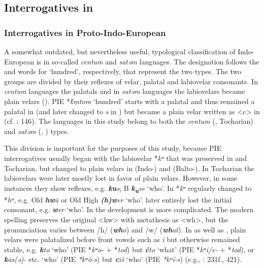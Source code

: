 \subsection{Interrogatives in }\label{sec:5.5.3}

\subsubsection{Interrogatives in Proto-{Indo-European}}\label{sec:5.5.3.1}

A somewhat outdated, but nevertheless useful, typological classification of {Indo-Euro\-pean} is in so-called \textit{centum} and \textit{satəm} languages. The designation follows the  and  words for ‘hundred’, respectively, that represent the two types. The two groups are divided by their reflexes of  velar, palatal and labiovelar consonants. In \textit{centum} languages the palatals and in \textit{satəm} languages the labiovelars became plain velars (). PIE *\textit{ḱ\d{m}}\textit{tom} ‘hundred’ starts with a palatal and thus remained a palatal in  (and later changed to \textit{s} in ) but became a plain velar written as <c> in  (cf. \citealt{Fortson2010}: 146). The languages in this study belong to both the \textit{centum} (, Tocharian) and \textit{satəm} (, ) types.

This division is important for the purposes of this study, because PIE interrogatives usually began with the labiovelar *\textit{kʷ} that was preserved in  and Tocharian, but changed to plain velars in (Indo-) and (Balto-). In Tocharian the labiovelars were later mostly lost in favor of plain velars. However, in some instances they show reflexes, e.g.  \textbf{\textit{ku}}\textit{s}, B \textbf{\textit{k}}\textbf{\textit{\textsubscript{u}}}\textit{se} ‘who’. In  *\textit{kʷ} regularly changed to *\textit{hʷ}, e.g. Old  \textbf{\textit{hw}}\textit{\=a} or Old High  \textbf{\textit{(h)w}}\textit{er} ‘who’.  later entirely lost the initial consonant, e.g.  \textbf{\textit{w}}\textit{er} ‘who’. In  the development is more complicated. The modern spelling preserves the original <hw> with metathesis as <wh>, but the pronunciation varies between /h/ (\textbf{\textit{wh}}\textit{o}) and /w/ (\textbf{\textit{wh}}\textit{at}). In  as well as , plain velars were palatalized before front vowels such as \textit{i} but otherwise remained stable, e.g.  \textbf{\textit{k}}\textit{to} ‘who’ (PIE *\textit{kʷ}\textit{o-} + *\textit{tod}) but \textbf{\textit{č}}\textit{to} ‘what’ (PIE *\textit{kʷ}\textit{i/e-} + *\textit{tod}), or  \textbf{\textit{k}}\textit{as(ə)-} etc. ‘who’ (PIE \textit{*kʷ}\textit{ó-s}) but \textbf{\textit{c}}\textit{iš} ‘who’ (PIE \textit{*kʷ}\textit{í-s}) (e.g., \citealt{Fortson2010}: 231f., 421).

